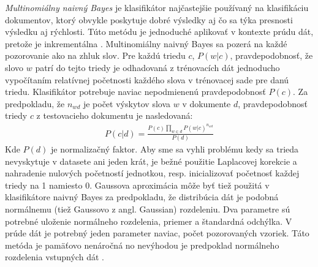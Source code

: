 \textit{Multinomiálny naivný Bayes} je klasifikátor najčastejšie používaný na klasifikáciu dokumentov, ktorý obvykle poskytuje dobré výsledky aj čo sa týka presnosti výsledku aj rýchlosti. Túto metódu je jednoduché aplikovať v kontexte prúdu dát, pretože je inkrementálna \citep{bifet2010sentiment}. Multinomiálny naivný Bayes sa pozerá na každé pozorovanie ako na zhluk slov. Pre každú triedu $c$, $P(w|c)$, pravdepodobnosť, že slovo $w$ patrí do tejto triedy je odhadovaná z trénovacích dát jednoducho vypočítaním relatívnej početnosti každého slova v trénovacej sade pre danú triedu. Klasifikátor potrebuje naviac nepodmienenú pravdepodobnosť $P(c)$. Za predpokladu, že $\displaystyle n_{wd}$ je počet výskytov slova $w$ v dokumente $d$, pravdepodobnosť triedy $c$ z testovacieho dokumentu je nasledovaná: \newline
\begin{align*}
P(c|d) = \frac{P(c)\prod _{w \in d} P(w|c)^{n_{wd}}} {P(d)}
\end{align*}
Kde $P(d)$ je normalizačný faktor. Aby sme sa vyhli problému kedy sa trieda nevyskytuje v datasete ani jeden krát, je bežné použitie Laplacovej korekcie a nahradenie nulových početností jednotkou, resp. inicializovať početnosť každej triedy na 1 namiesto 0. Gaussova aproximácia môže byť tiež použitá v klasifikátore naivný Bayes za predpokladu, že distribúcia dát je podobná normálnemu (tiež Gaussovo z angl. Gaussian) rozdeleniu. Dva parametre sú potrebné uloženie normálneho rozdelenia, priemer a štandardná odchýlka. V prúde dát je potrebný jeden parameter naviac, počet pozorovaných vzoriek. Táto metóda je pamäťovo nenáročná no nevýhodou je predpoklad normálneho rozdelenia vstupných dát \citep{salperwyck2015incremental}.

